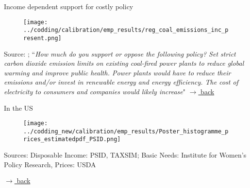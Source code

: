 \documentclass[11pt,aspectratio=169]{beamer}
\begin{document}
\begin{frame}{Income dependent support for costly policy}
	\hypertarget{rise2}{}
	\vspace{-4mm}
	\begin{figure}
		\texttt{[image: ../codding/calibration/emp\_results/reg\_coal\_emissions\_inc\_present.png]}
	\end{figure}
	\vspace{-3mm}
	\tiny{Source: \cite{CCAM}; ``\textit{How much do you support or oppose the
			following policy?
			Set strict carbon dioxide emission limits on
			existing coal-fired power plants to reduce
			global warming and improve public health.
			Power plants would have to reduce their
			emissions and/or invest in renewable energy
			and energy efficiency. The cost of electricity to
			consumers and companies would likely
			increase}"}
	\vspace{-9mm}
	\hfill	\hyperlink{backmov}{\tiny{$\rightarrow$ back}}
\end{frame}
	\begin{frame}{In the US}
			\hypertarget{indis}{}
		\vspace{-5mm}
	\begin{minipage}[]{1\textwidth}
		\begin{figure}
			\texttt{[image: ../codding\_new/calibration/emp\_results/Poster\_histogramme\_prices\_estimatedpdf\_PSID.png]}	
		\end{figure}
		\centering
		\tiny{Sources: Disposable Income: PSID, TAXSIM; Basic Needs: Institute for Women's Policy Research, Prices: USDA}
	\end{minipage}
	\vspace{-10mm}
	\hfill	\hyperlink{backmov}{\tiny{$\rightarrow$ back}}
\end{frame}
\end{document}
